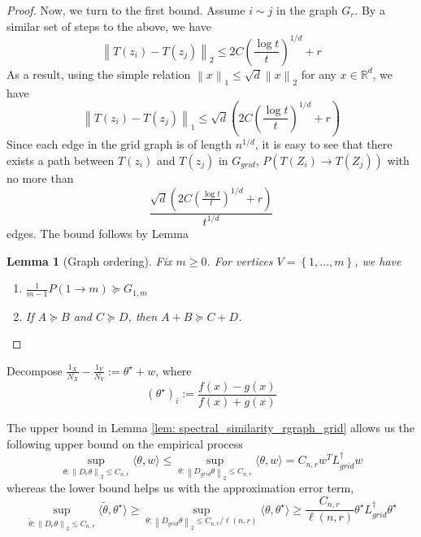 \documentclass{article}
\newcommand{\Reals}{\mathbb{R}}
\newcommand{\norm}[1]{\left\lVert#1\right\rVert}
\newcommand{\set}[1]{\left\{#1\right\}}
\newcommand{\dotp}[2]{\langle #1, #2 \rangle}
\newcommand{\1}{\mathbb{I}}
\newcommand{\Linv}{L^{\dagger}}
\newcommand{\Rd}{\Reals^d}
\theoremstyle{alden}
\theoremstyle{aldenthm}
\newtheorem{lemma}{Lemma}
\theoremstyle{definition}
\theoremstyle{remark}
\begin{document}
\begin{proof}
	Now, we turn to the first bound. Assume $i \sim j$ in the graph $G_r$. By a similar set of steps to the above, we have
	\begin{equation*}
	\norm{T(z_i) - T(z_j)}_2 \leq 2C\left(\frac{\log t}{t}\right)^{1/d} + r
	\end{equation*}
	As a result, using the simple relation $\norm{x}_1 \leq \sqrt{d} \norm{x}_2$ for any $x \in \Rd$, we have
	\begin{equation*}
	\norm{T(z_i) - T(z_j)}_1 \leq \sqrt{d}(2C\left(\frac{\log t}{t}\right)^{1/d} + r)
	\end{equation*}
	Since each edge in the grid graph is of length $n^{1/d}$, it is easy to see that there exists a path between $T(z_i)$ and $T(z_j)$ in $G_{grid}$, $P(T(Z_i) \to T(Z_j))$ with no more than
	\begin{equation*}
		\frac{\sqrt{d}(2C\left(\frac{\log t}{t}\right)^{1/d} + r)}{t^{1/d}}
	\end{equation*}
	edges. The bound follows by Lemma
	\begin{lemma}[Graph ordering]
	\label{lem: graph_ordering}
	Fix $m \geq 0$. For vertices $V = \set{1, \ldots,m}$, we have
	\begin{enumerate}
		\item $\frac{1}{m - 1}P(1 \to m) \succeq G_{1,m}$
		\item If $A \succeq B$ and $C \succeq D$, then $A + B \succeq C + D$. 
	\end{enumerate}
	\end{lemma}
\end{proof}

Decompose $\frac{1_X}{N_X} - \frac{1_Y}{N_Y} := \theta^{\star} + w$, where
\begin{equation*}
(\theta^{\star})_i := \frac{f(x) - g(x)}{f(x) + g(x)}
\end{equation*}

The upper bound in Lemma \ref{lem: spectral_similarity_rgraph_grid} allows us the following upper bound on the empirical process
\begin{equation*}
\sup_{\theta: \norm{D_{r}\theta}_2 \leq C_{n,r}} \dotp{\theta}{w} \leq  \sup_{\theta: \norm{D_{grid}\theta}_2 \leq C_{n,r}} \dotp{\theta}{w} = C_{n,r} w^T{\Linv_{grid}}w 
\end{equation*}
whereas the lower bound helps us with the approximation error term,
\begin{equation*}
\sup_{\widetilde{\theta}: \norm{D_{r}\theta}_2 \leq C_{n,r}} \dotp{\widetilde{\theta}}{\theta^{\star}} \geq \sup_{\theta: \norm{D_{grid}\theta}_2 \leq C_{n,r}/ \ell(n,r)} \dotp{\theta}{\theta^{\star}} \geq \frac{C_{n,r}}{\ell(n,r)} \theta^{\star}\Linv_{grid} \theta^{\star}
\end{equation*}

\clearpage



\end{document}
